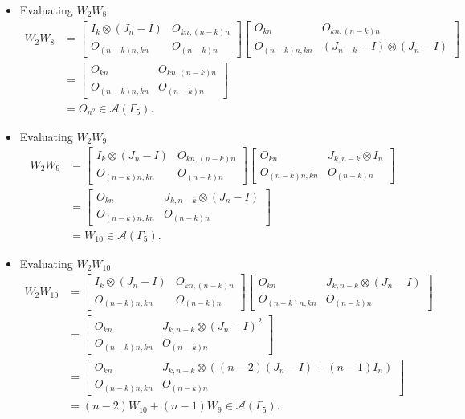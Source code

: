 \begin{itemize}
\item Evaluating $W_{2}W_{8}$
\begin{align*}
W_2W_8 &=
\begin{bmatrix}
I_k \otimes (J_n - I) & O_{kn, (n-k)n} \\
O_{(n-k)n,kn} & O_{(n-k)n}
\end{bmatrix}
\begin{bmatrix}
O_{kn} & O_{kn, (n-k)n} \\
O_{(n-k)n,kn} & (J_{n-k} - I) \otimes (J_n-I)
\end{bmatrix}\\
&= \begin{bmatrix}
O_{kn} & O_{kn, (n-k)n} \\
O_{(n-k)n,kn} & O_{(n - k)n}
\end{bmatrix}\\
&= O_{n^2} \in\mathcal{A}(\Gamma_5).
\end{align*}

\item Evaluating $W_{2}W_{9}$
\begin{align*}
W_2W_9 &=
\begin{bmatrix}
I_k \otimes (J_n - I) & O_{kn, (n-k)n} \\
O_{(n-k)n,kn} & O_{(n-k)n}
\end{bmatrix}
\begin{bmatrix}
O_{kn} & J_{k,n-k} \otimes I_n \\
O_{(n-k)n,kn} & O_{(n-k)n}
\end{bmatrix}\\
&=
\begin{bmatrix}
O_{kn} & J_{k,n-k} \otimes (J_n - I) \\
O_{(n-k)n,kn} & O_{(n-k)n}
\end{bmatrix}\\
&= W_{10}\in\mathcal{A}(\Gamma_5).
\end{align*}

\item Evaluating $W_{2}W_{10}$
\begin{align*}
W_2W_{10} &=
\begin{bmatrix}
I_k \otimes (J_n - I) & O_{kn, (n-k)n} \\
O_{(n-k)n,kn} & O_{(n-k)n}
\end{bmatrix}
\begin{bmatrix}
O_{kn} & J_{k,n-k} \otimes (J_n - I) \\
O_{(n-k)n,kn} & O_{(n-k)n}
\end{bmatrix}\\
&=
\begin{bmatrix}
O_{kn} & J_{k,n-k} \otimes (J_n - I)^2 \\
O_{(n-k)n,kn} & O_{(n-k)n}
\end{bmatrix}\\
&= 
\begin{bmatrix}
O_{kn} & J_{k,n-k} \otimes ((n-2)(J_n - I) + (n-1)I_n) \\
O_{(n-k)n,kn} & O_{(n-k)n}
\end{bmatrix}\\
&= (n-2)W_{10} + (n-1)W_9\in\mathcal{A}(\Gamma_5).
\end{align*}


\end{itemize}
